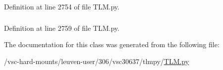 Definition at line 2754 of file TLM.py.\hypertarget{classtlmpy_1_1TLM_1_1lgmres__counter_abe12d76f3415a6e1bc658ea54ec7c8d7}{
\subsubsection[{residu}]{}}
\label{classtlmpy_1_1TLM_1_1lgmres__counter_abe12d76f3415a6e1bc658ea54ec7c8d7}


Definition at line 2759 of file TLM.py.

The documentation for this class was generated from the following file:\begin{DoxyCompactItemize}
\item 
/vsc-\/hard-\/mounts/leuven-\/user/306/vsc30637/tlmpy/\hyperlink{TLM_8py}{TLM.py}\end{DoxyCompactItemize}
